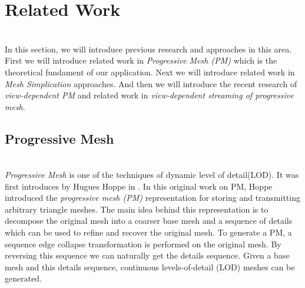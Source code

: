 
\section{Related Work}
\label{section:relWork}
\\
In this section, we will introduce previous research and approaches in this area. 
First we will introduce related work in \emph{Progressive Mesh (PM)} which is the theoretical fundament of our application.
Next we will introduce related work in \emph{Mesh Simplication} approaches.   
And then we will introduce the recent research of \emph{view-dependent PM} and related work in \emph{view-dependent streaming of progressive mesh}. 

\subsection{Progressive Mesh}
\label{subsection:relWork:pm}
\\
\emph{Progressive Mesh} is one of the techniques of dynamic level of detail(LOD). It was first introduces by Hugues Hoppe in \cite{Hoppe:1996:PM}. In this original work on PM, Hoppe introduced the \emph{progressive mesh (PM)} representation for storing and transmitting arbitrary triangle meshes. The main idea behind this representation is to decompose the original mesh into a coarser base mesh and a sequence of details which can be used to refine and recover the original mesh. To generate a PM, a sequence edge collapse transformation is performed on the original mesh. By reversing this sequence we can naturally get the details sequence. Given a base mesh and this details sequence, continuous levels-of-detail (LOD) meshes can be generated.  


